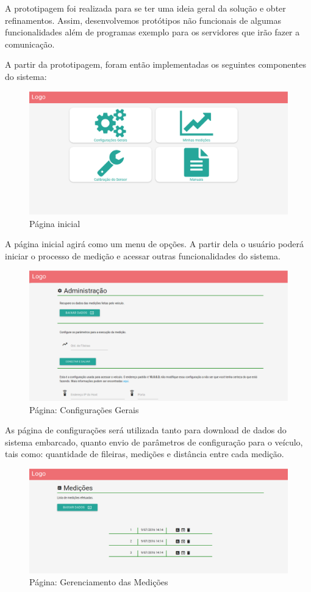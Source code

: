   A prototipagem foi realizada para se ter uma ideia geral da solução e obter 
  refinamentos. Assim, desenvolvemos protótipos não funcionais de algumas funcionalidades
  além de programas exemplo para os servidores que irão fazer a comunicação.

  A partir da prototipagem, foram então implementadas os seguintes componentes
  do sistema:

  \begin{figure}[!htbp]
  \begin{center}
  \includegraphics[width=.6\textwidth]{figuras/index.eps}
  \caption{\label{fig:print_index}Página inicial}
  \end{center}
  \end{figure}
  
  A página inicial agirá como um menu de opções. A partir dela o usuário poderá
  iniciar o processo de medição e acessar outras funcionalidades do sistema.

  \begin{figure}[!htbp]
  \begin{center}
  \includegraphics[width=.6\textwidth]{figuras/config.eps}
  \caption{\label{fig:print_config}Página: Configurações Gerais}
  \end{center}
  \end{figure}

  As página de configurações será utilizada tanto para download de dados do sistema
  embarcado, quanto envio de parâmetros de configuração para o veículo, tais como:
  quantidade de fileiras, medições e distância entre cada medição.

  \begin{figure}[!htbp]
  \begin{center}
  \includegraphics[width=.7\textwidth]{figuras/medicoes.eps}
  \caption{\label{fig:print_medicoes}Página: Gerenciamento das Medições}
  \end{center}
  \end{figure}

